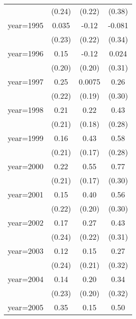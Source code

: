 \begin{sidewaystable}[htbp]
\begin{tabular}{l*{3}{c}}
                &   (0.24)         &   (0.22)         &   (0.38)         \\
\addlinespace
year=1995       &    0.035         &    -0.12         &   -0.081         \\
                &   (0.23)         &   (0.22)         &   (0.34)         \\
\addlinespace
year=1996       &     0.15         &    -0.12         &    0.024         \\
                &   (0.20)         &   (0.20)         &   (0.31)         \\
\addlinespace
year=1997       &     0.25         &   0.0075         &     0.26         \\
                &   (0.22)         &   (0.19)         &   (0.30)         \\
\addlinespace
year=1998       &     0.21         &     0.22         &     0.43         \\
                &   (0.21)         &   (0.18)         &   (0.28)         \\
\addlinespace
year=1999       &     0.16         &     0.43\sym{**} &     0.58\sym{**} \\
                &   (0.21)         &   (0.17)         &   (0.28)         \\
\addlinespace
year=2000       &     0.22         &     0.55\sym{***}&     0.77\sym{**} \\
                &   (0.21)         &   (0.17)         &   (0.30)         \\
\addlinespace
year=2001       &     0.15         &     0.40\sym{*}  &     0.56\sym{*}  \\
                &   (0.22)         &   (0.20)         &   (0.30)         \\
\addlinespace
year=2002       &     0.17         &     0.27         &     0.43         \\
                &   (0.24)         &   (0.22)         &   (0.31)         \\
\addlinespace
year=2003       &     0.12         &     0.15         &     0.27         \\
                &   (0.24)         &   (0.21)         &   (0.32)         \\
\addlinespace
year=2004       &     0.14         &     0.20         &     0.34         \\
                &   (0.23)         &   (0.20)         &   (0.32)         \\
\addlinespace
year=2005       &     0.35         &     0.15         &     0.50\sym{*}  \\

\end{tabular}
\end{sidewaystable}
